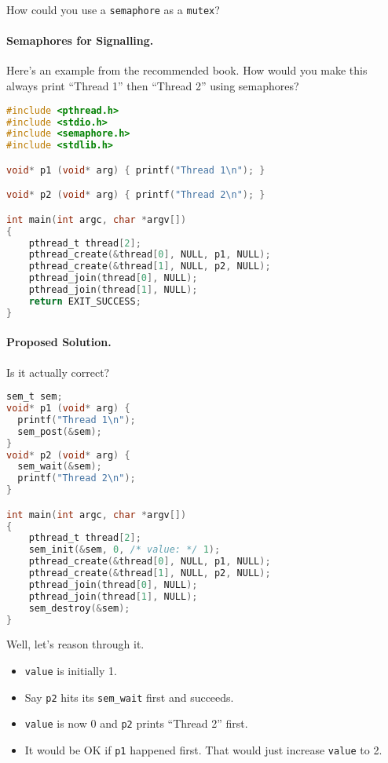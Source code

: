 \noindent
How could you use a {\tt semaphore} as a {\tt mutex}?
\vspace*{3em}


\paragraph{Semaphores for Signalling.}
Here's an example from the recommended book. How would you make this always print
``Thread 1'' then ``Thread 2'' using semaphores?

\begin{lstlisting}[language=C]
#include <pthread.h>
#include <stdio.h>
#include <semaphore.h>
#include <stdlib.h>

void* p1 (void* arg) { printf("Thread 1\n"); }

void* p2 (void* arg) { printf("Thread 2\n"); }

int main(int argc, char *argv[])
{
    pthread_t thread[2];
    pthread_create(&thread[0], NULL, p1, NULL);
    pthread_create(&thread[1], NULL, p2, NULL);
    pthread_join(thread[0], NULL);
    pthread_join(thread[1], NULL);
    return EXIT_SUCCESS;
}
\end{lstlisting}

\paragraph{Proposed Solution.} Is it actually correct?

\begin{lstlisting}[language=C]
sem_t sem;
void* p1 (void* arg) {
  printf("Thread 1\n");
  sem_post(&sem);
}
void* p2 (void* arg) {
  sem_wait(&sem);
  printf("Thread 2\n");
}

int main(int argc, char *argv[])
{
    pthread_t thread[2];
    sem_init(&sem, 0, /* value: */ 1);
    pthread_create(&thread[0], NULL, p1, NULL);
    pthread_create(&thread[1], NULL, p2, NULL);
    pthread_join(thread[0], NULL);
    pthread_join(thread[1], NULL);
    sem_destroy(&sem);
}
\end{lstlisting}

Well, let's reason through it.  
  \begin{itemize}
    \item {\tt value} is initially 1.
    \item Say {\tt p2} hits its {\tt sem\_wait} first and succeeds.
    \item {\tt value} is now 0 and {\tt p2} prints ``Thread 2'' first.
    \item It would be OK if {\tt p1} happened first. That would just increase
      {\tt value} to 2.
    \end{itemize}

